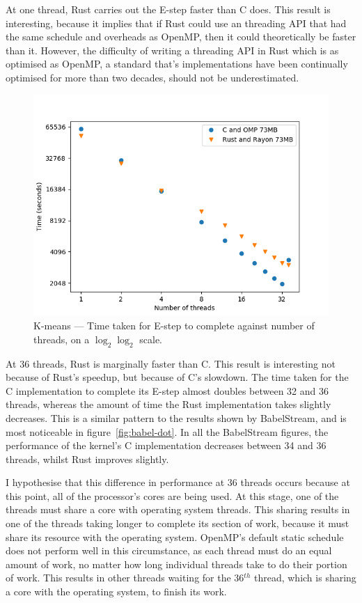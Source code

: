 At one thread, Rust carries out the E-step faster than C does. This result is interesting, because it implies that if Rust could use an threading API that had the same schedule and overheads as OpenMP, then it could theoretically be faster than it. However, the difficulty of writing a threading API in Rust which is as optimised as OpenMP, a standard that's implementations have been continually optimised for more than two decades, should not be underestimated.

\begin{figure}[h]
\centering
\includegraphics[width=.9\linewidth]{figs/kmeans/time.png}
\caption[K-means --- Time]{K-means --- Time taken for E-step to complete against number of threads, on a $\log_2 \log_2$ scale.}\label{fig:kmeans-time}
\end{figure}

At 36 threads, Rust is marginally faster than C. This result is interesting not because of Rust's speedup, but because of C's slowdown. The time taken for the C implementation to complete its E-step almost doubles between 32 and 36 threads, whereas the amount of time the Rust implementation takes slightly decreases. This is a similar pattern to the results shown by BabelStream, and is most noticeable in figure~\ref{fig:babel-dot}.
In all the BabelStream figures, the performance of the kernel's C implementation decreases between 34 and 36 threads, whilst Rust improves slightly.

I hypothesise that this difference in performance at 36 threads occurs because at this point, all of the processor's cores are being used. At this stage, one of the threads must share a core with operating system threads. This sharing results in one of the threads taking longer to complete its section of work, because it must share its resource with the operating system. OpenMP's default static schedule does not perform well in this circumstance, as each thread must do an equal amount of work, no matter how long individual threads take to do their portion of work.
This results in other threads waiting for the 36$^{th}$ thread, which is sharing a core with the operating system, to finish its work.


